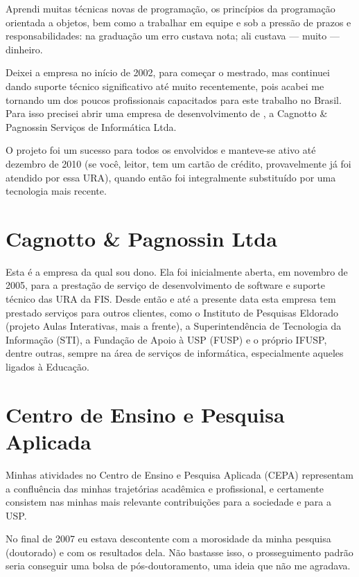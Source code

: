Aprendi muitas técnicas novas de programação, os princípios da programação orientada a objetos, bem como a trabalhar em equipe e sob a pressão de prazos e responsabilidades: na graduação um erro custava nota; ali custava --- muito --- dinheiro.

Deixei a empresa no início de 2002, para começar o mestrado, mas continuei dando suporte técnico significativo até muito recentemente, pois acabei me tornando um dos poucos profissionais capacitados para este trabalho no Brasil. Para isso precisei abrir uma empresa de desenvolvimento de , a Cagnotto \& Pagnossin Serviços de Informática Ltda.

O projeto foi um sucesso para todos os envolvidos e manteve-se ativo até dezembro de 2010 (se você, leitor, tem um cartão de crédito, provavelmente já foi atendido por essa URA), quando então foi integralmente substituído por uma tecnologia mais recente.

\section{Cagnotto \& Pagnossin Ltda}

Esta é a empresa da qual sou dono. Ela foi inicialmente aberta, em novembro de 2005, para a prestação de serviço de desenvolvimento de software e suporte técnico das URA da FIS. Desde então e até a presente data esta empresa tem prestado serviços para outros clientes, como o Instituto de Pesquisas Eldorado (projeto Aulas Interativas, mais a frente), a Superintendência de Tecnologia da Informação (STI), a Fundação de Apoio à USP (FUSP) e o próprio IFUSP, dentre outras, sempre na área de serviços de informática, especialmente aqueles ligados à Educação.

\section{Centro de Ensino e Pesquisa Aplicada}
\label{sec:cepa}

Minhas atividades no Centro de Ensino e Pesquisa Aplicada (CEPA) representam a confluência das minhas trajetórias acadêmica e profissional, e certamente consistem nas minhas mais relevante contribuições para a sociedade e para a USP.

No final de 2007 eu estava descontente com a morosidade da minha pesquisa (doutorado) e com os resultados dela. Não bastasse isso, o prosseguimento padrão seria conseguir uma bolsa de pós-doutoramento, uma ideia que não me agradava.

